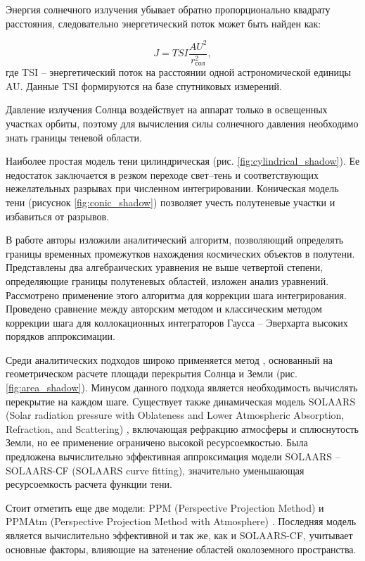 Энергия солнечного излучения убывает обратно пропорционально квадрату расстояния, следовательно
энергетический поток может быть найден как:

\begin{equation*}
    J = TSI \frac{AU^2}{r^2_{\text{сол}}},
\end{equation*}
где TSI -- энергетический поток на расстоянии одной астрономической единицы AU.
Данные TSI формируются на базе спутниковых измерений.

Давление излучения Солнца воздействует на аппарат только в освещенных участках орбиты,
поэтому для вычисления силы солнечного давления необходимо знать границы теневой области.

Наиболее простая модель тени цилиндрическая (рис. \ref{fig:cylindrical_shadow}). Ее недостаток заключается в резком переходе
свет--тень и соответствующих нежелательных разрывах при численном интегрировании.
Коническая модель тени (рисуснок \ref{fig:conic_shadow}) позволяет учесть полутеневые участки и избавиться от разрывов.

В работе \cite{kuznetsov2024} авторы изложили аналитический алгоритм, позволяющий определять границы временных промежутков нахождения космических объектов в полутени. Представлены
два алгебраических уравнения не выше четвертой степени, определяющие границы полутеневых областей, изложен анализ уравнений. Рассмотрено применение этого
алгоритма для коррекции шага интегрирования. Проведено сравнение между авторским методом и классическим методом коррекции шага для коллокационных интеграторов
Гаусса – Эверхарта высоких порядков аппроксимации.

Среди аналитических подходов широко применяется метод \cite{zhang2019}, основанный на геометрическом
расчете площади перекрытия Солнца и Земли (рис. \ref{fig:area_shadow}). Минусом данного подхода является необходимость
вычислять перекрытие на каждом шаге. 
Существует также динамическая модель SOLAARS 
(Solar radiation pressure with Oblateness and Lower Atmospheric Absorption, Refraction, and Scattering) \cite{Robertson2014}, включающая рефракцию атмосферы и
сплюснутость Земли, но ее применение ограничено высокой ресурсоемкостью. Была предложена
вычислительно эффективная аппроксимация модели SOLAARS -- SOLAARS-СF (SOLAARS curve fitting), значительно уменьшающая
ресурсоемкость расчета функции тени.

Стоит отметить еще две модели: PPM (Perspective
Projection Method) \cite{Oswald1982} и PPMAtm (Perspective Projection Method with Atmosphere) \cite{Li2019}.
Последняя модель является вычислительно эффективной и так же, как и SOLAARS-CF,
учитывает основные факторы, влияющие на затенение областей околоземного пространства.

